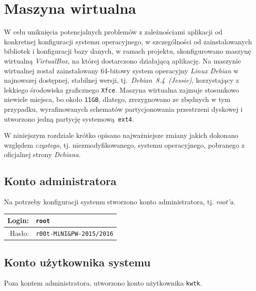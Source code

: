 \documentclass[a4paper,titlepage]{article}
\theoremstyle{break}
\numberwithin{equation}{subsection}
\begin{document}

\section{Maszyna wirtualna}
\label{sec:maszyna-wirtualna}

W celu uniknięcia potencjalnych problemów z zależnościami aplikacji od konkretnej konfiguracji systemu operacyjnego, w szczególności od zainstalowanych bibliotek i konfiguracji bazy danych, w ramach projektu, skonfigurowano maszynę wirtualną \emph{VirtualBox}, na której dostarczono działającą aplikację. Na maszynie wirtualnej został zainstalowany 64-bitowy system operacyjny \emph{Linux Debian} w najnowszej dostępnej, stabilnej wersji, tj.~\emph{Debian~8.4~(Jessie)}, korzystający z lekkiego środowiska graficznego \texttt{Xfce}. Maszyna wirtualna zajmuje stosunkowo niewiele miejsca, bo około \texttt{11GB}, dlatego, zrezygnowano ze zbędnych w tym przypadku, wyrafinowanych schematów partycjonowania przestrzeni dyskowej i utworzono jedną partycję systemową~\texttt{ext4}.

W niniejszym rozdziale krótko opisano najważniejsze zmiany jakich dokonano względem \emph{czystego}, tj. niezmodyfikowanego, systemu operacyjnego, pobranego z oficjalnej strony \emph{Debiana}.


\subsection{Konto administratora}

Na potrzeby konfiguracji systemu stworzono konto administratora, tj. \emph{root'a}.

\begin{tabular}{r|l}
Login: & \texttt{root}\\
\hline
Hasło: & \texttt{r00t-MiNI\&PW-2015/2016}\\
\end{tabular}


\subsection{Konto użytkownika systemu}

Poza kontem administratora, utworzono konto użytkownika \texttt{kwtk}.
\end{document}
